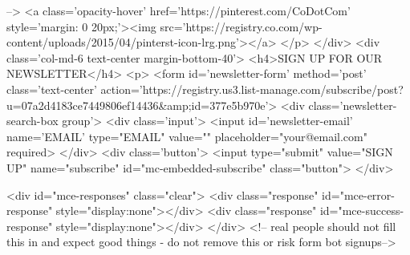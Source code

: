 -->
                        <a class='opacity-hover' href='https://pinterest.com/CoDotCom' style='margin: 0 20px;'><img src='https://registry.co.com/wp-content/uploads/2015/04/pinterst-icon-lrg.png'></a>
                    </p>
                </div>
                <div class='col-md-6 text-center margin-bottom-40'>
                    <h4>SIGN UP FOR OUR NEWSLETTER</h4>
                    <p>
                        <form id='newsletter-form' method='post' class='text-center' action='https://registry.us3.list-manage.com/subscribe/post?u=07a2d4183ce7449806ef14436&amp;id=377e5b970e'>
                            <div class='newsletter-search-box group'>
                                <div class='input'> 
                                    <input id='newsletter-email' name='EMAIL' type="EMAIL" value="" placeholder="your@email.com" required>
                                </div>
                                <div class='button'>
                                    <input type="submit" value="SIGN UP" name="subscribe" id="mc-embedded-subscribe" class="button">
                                </div>

  				<div id="mce-responses" class="clear">
					<div class="response" id="mce-error-response" style="display:none"></div>
					<div class="response" id="mce-success-response" style="display:none"></div>
				</div>    <!-- real people should not fill this in and expect good things - do not remove this or risk form bot signups-->


